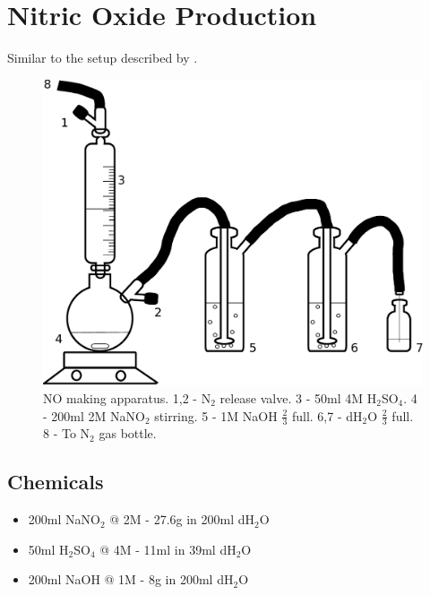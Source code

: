 \section{Nitric Oxide Production}
Similar to the setup described by \cite{Aga2008}.
\begin{figure}
 \centering
 \includegraphics[width=14cm]{./02-materialsmethods/data/drawing.pdf}
 \caption{\footnotesize NO making apparatus. 1,2 - N$_{\textrm{2}}$ release valve. 3 - 50ml 4M H$_{\textrm{2}}$SO$_{\textrm{4}}$. 4 - 200ml 2M NaNO$_{\textrm{2}}$ stirring. 5 - 1M NaOH $\frac{2}{3}$ full. 6,7 - dH$_{\textrm{2}}$O $\frac{2}{3}$ full. 8 - To N$_{\textrm{2}}$ gas bottle.}
\end{figure}
\subsection*{Chemicals}
\begin{itemize}
 \item 200ml NaNO$_{\textrm{2}}$ @ 2M - 27.6g in 200ml dH$_{\textrm{2}}$O
 \item 50ml H$_{\textrm{2}}$SO$_{\textrm{4}}$ @ 4M - 11ml in 39ml dH$_{\textrm{2}}$O
 \item 200ml NaOH @ 1M - 8g in 200ml dH$_{\textrm{2}}$O
\end{itemize}

